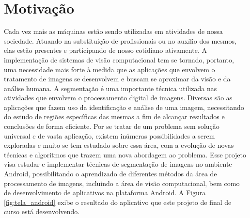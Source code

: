 \section{Motivação}
Cada vez mais as máquinas estão sendo utilizadas em atividades de nossa sociedade. Atuando na substituição de profissionais ou no auxílio dos mesmos, elas estão presentes e participando de nosso cotidiano ativamente. A implementação de sistemas de visão computacional tem se tornado, portanto, uma necessidade mais forte à medida que as aplicações que envolvem o tratamento de imagens se desenvolvem e buscam se aproximar da visão e da análise humana.
A segmentação é uma importante técnica utilizada nas atividades que envolvem o processamento digital de imagens. Diversas são as aplicações que fazem uso da identificação e análise de uma imagem, necessitando do estudo de regiões específicas das mesmas a fim de alcançar resultados e conclusões de forma eficiente.
Por se tratar de um problema sem solução universal e de vasta aplicação,  existem inúmeras possibilidades a serem exploradas e muito se tem estudado sobre essa área, com a evolução de novas técnicas e algoritmos que trazem uma nova abordagem ao problema.
Esse projeto visa estudar e implementar técnicas de segmentação de imagens no ambiente Android, possibilitando o aprendizado de diferentes métodos da área de processamento de imagens, incluindo a área de visão computacional, bem como de desenvolvimento de aplicativos na plataforma Android. A Figura \ref{fig:tela_android} exibe o resultado do aplicativo que este projeto de final de curso está desenvolvendo.



